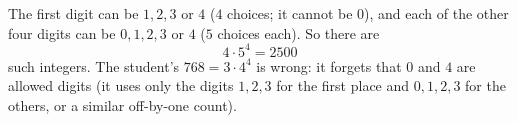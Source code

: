 The first digit can be $1,2,3$ or $4$ ($4$ choices; it cannot be $0$), and each of the other four digits can be $0,1,2,3$ or $4$ ($5$ choices each). So there are
\[
4\cdot5^4=\boxed{2500}
\]
such integers. The student's $768=3\cdot4^4$ is wrong: it forgets that $0$ and $4$ are allowed digits (it uses only the digits $1,2,3$ for the first place and $0,1,2,3$ for the others, or a similar off-by-one count).
